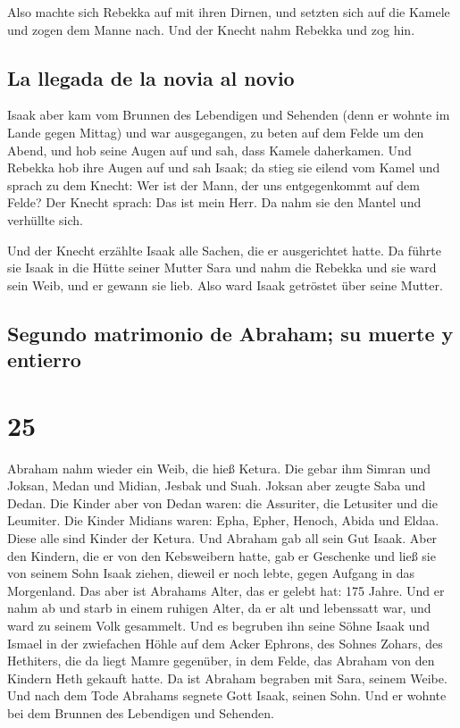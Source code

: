  Also machte sich Rebekka auf mit ihren Dirnen, und
setzten sich auf die Kamele und zogen dem Manne nach. Und der Knecht
nahm Rebekka und zog hin.

\hypertarget{la-llegada-de-la-novia-al-novio}{%
\subsection{La llegada de la novia al
novio}\label{la-llegada-de-la-novia-al-novio}}

 Isaak aber kam vom Brunnen des Lebendigen und Sehenden
(denn er wohnte im Lande gegen Mittag)  und war
ausgegangen, zu beten auf dem Felde um den Abend, und hob seine Augen
auf und sah, dass Kamele daherkamen.  Und Rebekka hob
ihre Augen auf und sah Isaak; da stieg sie eilend vom Kamel
 und sprach zu dem Knecht: Wer ist der Mann, der uns
entgegenkommt auf dem Felde? Der Knecht sprach: Das ist mein Herr. Da
nahm sie den Mantel und verhüllte sich.

 Und der Knecht erzählte Isaak alle Sachen, die er
ausgerichtet hatte.  Da führte sie Isaak in die Hütte
seiner Mutter Sara und nahm die Rebekka und sie ward sein Weib, und er
gewann sie lieb. Also ward Isaak getröstet über seine Mutter.

\hypertarget{segundo-matrimonio-de-abraham-su-muerte-y-entierro}{%
\subsection{Segundo matrimonio de Abraham; su muerte y
entierro}\label{segundo-matrimonio-de-abraham-su-muerte-y-entierro}}

\hypertarget{section-24}{%
\section{25}\label{section-24}}

 Abraham nahm wieder ein Weib, die hieß Ketura.
 Die gebar ihm Simran und Joksan, Medan und Midian, Jesbak
und Suah.  Joksan aber zeugte Saba und Dedan. Die Kinder
aber von Dedan waren: die Assuriter, die Letusiter und die Leumiter.
 Die Kinder Midians waren: Epha, Epher, Henoch, Abida und
Eldaa. Diese alle sind Kinder der Ketura.  Und Abraham gab
all sein Gut Isaak.  Aber den Kindern, die er von den
Kebsweibern hatte, gab er Geschenke und ließ sie von seinem Sohn Isaak
ziehen, dieweil er noch lebte, gegen Aufgang in das Morgenland.
 Das aber ist Abrahams Alter, das er gelebt hat: 175
Jahre.  Und er nahm ab und starb in einem ruhigen Alter,
da er alt und lebenssatt war, und ward zu seinem Volk gesammelt.
 Und es begruben ihn seine Söhne Isaak und Ismael in der
zwiefachen Höhle auf dem Acker Ephrons, des Sohnes Zohars, des
Hethiters, die da liegt Mamre gegenüber,  in dem Felde,
das Abraham von den Kindern Heth gekauft hatte. Da ist Abraham begraben
mit Sara, seinem Weibe.  Und nach dem Tode Abrahams
segnete Gott Isaak, seinen Sohn. Und er wohnte bei dem Brunnen des
Lebendigen und Sehenden.

